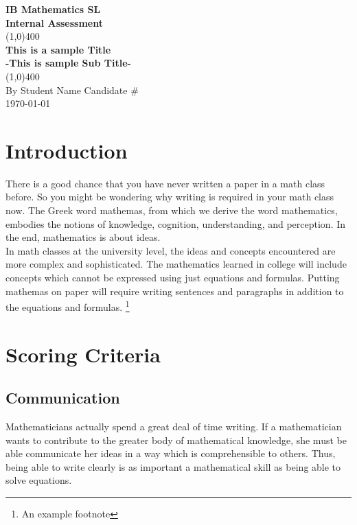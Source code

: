 \documentclass[11pt]{article}
\begin{document}
\begin{titlepage}
\begin{center}
\vspace{1cm}
\Large{\textbf{IB Mathematics SL}}\\
\Large{\textbf{Internal Assessment}}\\
\vfill
\line(1,0){400}\\[1mm]
\huge{\textbf{This is a sample Title}}\\[3mm]
\Large{\textbf{-This is sample Sub Title-}}\\[1mm]
\line(1,0){400}\\
\vfill
By Student Name
Candidate \#\\
\today \\
\end{center}
\end{titlepage}

\tableofcontents
\thispagestyle{empty}
\clearpage
\setcounter{page}{1}

\section{Introduction}

There is a good chance that you have never written a paper in a math class before. So you
might be wondering why writing is required in your math class now.
The Greek word mathemas, from which we derive the word mathematics, embodies the
notions of knowledge, cognition, understanding, and perception. In the end, mathematics is
about ideas.\cite{DBHS2}\\

 In math classes at the university level, the ideas and concepts encountered are
more complex and sophisticated. The mathematics learned in college will include concepts
which cannot be expressed using just equations and formulas. Putting mathemas on paper
will require writing sentences and paragraphs in addition to the equations and formulas. \footnote{An example footnote}

\section{Scoring Criteria}

\subsection{Communication}
Mathematicians actually spend a great deal of time writing. If a mathematician wants to contribute to the greater body of mathematical knowledge, she must be able communicate her ideas in a way which is comprehensible to others. Thus, being able to write clearly is as important a mathematical skill as being able to solve equations.
\end{document}
